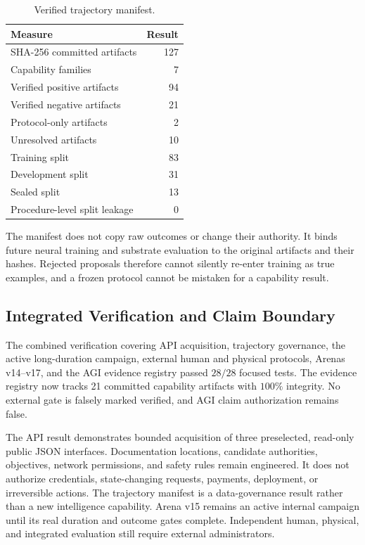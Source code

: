 \begin{table}[htbp]
\centering
\caption{Verified trajectory manifest.}
\label{tab:trajectory-manifest}
\begin{tabular}{lr}
\hline
Measure & Result \\
\hline
SHA-256 committed artifacts & 127 \\
Capability families & 7 \\
Verified positive artifacts & 94 \\
Verified negative artifacts & 21 \\
Protocol-only artifacts & 2 \\
Unresolved artifacts & 10 \\
Training split & 83 \\
Development split & 31 \\
Sealed split & 13 \\
Procedure-level split leakage & 0 \\
\hline
\end{tabular}
\end{table}

The manifest does not copy raw outcomes or change their authority.  It binds
future neural training and substrate evaluation to the original artifacts and
their hashes.  Rejected proposals therefore cannot silently re-enter training
as true examples, and a frozen protocol cannot be mistaken for a capability
result.

\subsection{Integrated Verification and Claim Boundary}

The combined verification covering API acquisition, trajectory governance,
the active long-duration campaign, external human and physical protocols,
Arenas v14--v17, and the AGI evidence registry passed $28/28$ focused tests.
The evidence registry now tracks 21 committed capability artifacts with
$100\%$ integrity.  No external gate is falsely marked verified, and AGI claim
authorization remains false.

The API result demonstrates bounded acquisition of three preselected,
read-only public JSON interfaces.  Documentation locations, candidate
authorities, objectives, network permissions, and safety rules remain
engineered.  It does not authorize credentials, state-changing requests,
payments, deployment, or irreversible actions.  The trajectory manifest is a
data-governance result rather than a new intelligence capability.  Arena v15
remains an active internal campaign until its real duration and outcome gates
complete.  Independent human, physical, and integrated evaluation still
require external administrators.
